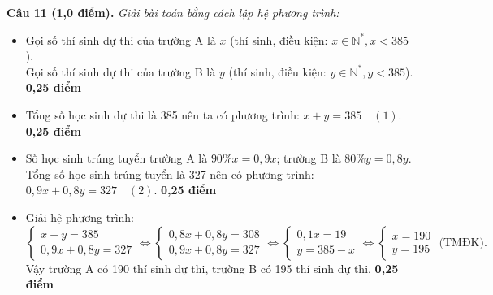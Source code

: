 \documentclass[12pt,a4paper]{article}
\begin{document}
\noindent\textbf{Câu 11 (1,0 điểm).} \textit{Giải bài toán bằng cách lập hệ phương trình:}
\begin{itemize}[leftmargin=16pt, itemsep=1.5pt, parsep=0pt]
  \item Gọi số thí sinh dự thi của trường A là $x$ (thí sinh, điều kiện: $x \in \mathbb{N}^*, x < 385$).\\
  Gọi số thí sinh dự thi của trường B là $y$ (thí sinh, điều kiện: $y \in \mathbb{N}^*, y < 385$). \dotfill \textbf{0,25 điểm}
  \item Tổng số học sinh dự thi là 385 nên ta có phương trình: $x + y = 385 \quad (1)$. \dotfill \textbf{0,25 điểm}
  \item Số học sinh trúng tuyển trường A là $90\%x = 0{,}9x$; trường B là $80\%y = 0{,}8y$.\\
  Tổng số học sinh trúng tuyển là 327 nên có phương trình: $0{,}9x + 0{,}8y = 327 \quad (2)$. \dotfill \textbf{0,25 điểm}
  \item Giải hệ phương trình:
  \[
    \begin{cases}
      x + y = 385 \\
      0{,}9x + 0{,}8y = 327
    \end{cases}
    \iff
    \begin{cases}
      0{,}8x + 0{,}8y = 308 \\
      0{,}9x + 0{,}8y = 327
    \end{cases}
    \iff
    \begin{cases}
      0{,}1x = 19 \\
      y = 385 - x
    \end{cases}
    \iff
    \begin{cases}
      x = 190 \\
      y = 195
    \end{cases}
    \text{ (TMĐK)}.
  \]
  Vậy trường A có 190 thí sinh dự thi, trường B có 195 thí sinh dự thi. \dotfill \textbf{0,25 điểm}
\end{itemize}

\newpage
\end{document}
